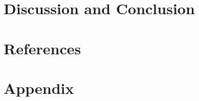 \documentclass[12pt]{article}
\begin{document}
\section{Discussion and Conclusion}


\section{References}


\clearpage

\section{Appendix}

\setcounter{table}{0}
\renewcommand{\thetable}{A\arabic{table}}

\setcounter{figure}{0}
\renewcommand{\thefigure}{A\arabic{figure}}
\end{document}
